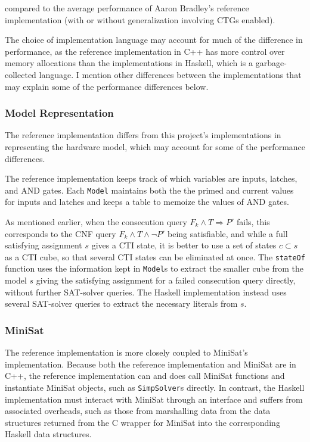 \documentclass[12pt,a4paper,twoside,openright]{report}
\begin{document}
{compared to the average performance of Aaron Bradley's reference implementation (with or without generalization
involving CTGs enabled).

The choice of implementation language may account for much of the difference in performance, as the reference
implementation in C++ has more control over memory allocations than the implementations in Haskell, which is
a garbage-collected language. I mention other differences between the implementations that may explain some of the
performance differences below.

\subsubsection{Model Representation}
The reference implementation differs from this project's implementations in representing the hardware model,
which may account for some of the performance differences.

The reference implementation keeps track of which variables are inputs, latches, and AND gates.
Each \verb,Model, maintains both the the primed and current values for inputs and latches and keeps a
table to memoize the values of AND gates.


As mentioned earlier, when the consecution query $F_k \wedge T \Rightarrow P'$ fails, this corresponds
to the CNF query $F_k \wedge T \wedge \neg P'$ being satisfiable, and while a full satisfying assignment
$s$ gives a CTI state, it is better to use a set of states $c \subset s$ as a CTI cube, so that several
CTI states can be eliminated at once.
The \verb,stateOf, function uses the information kept in \verb,Model,s to extract the smaller
cube from the model $s$ giving the satisfying assignment for a failed consecution query directly,
without further SAT-solver queries.
The Haskell implementation instead uses several SAT-solver queries to extract the necessary literals
from $s$.

\subsubsection{MiniSat}
The reference implementation is more closely coupled to MiniSat's implementation. Because both the reference
implementation and MiniSat are in C++, the reference implementation can and does call MiniSat functions
and instantiate MiniSat objects, such as \verb,SimpSolver,s directly. In contrast, the Haskell implementation
must interact with MiniSat through an interface and suffers from associated overheads, such as those from
marshalling data from the data structures returned from the C wrapper for MiniSat into the corresponding
Haskell data structures.

}
\end{document}
